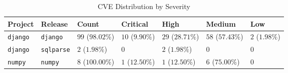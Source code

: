 \begin{table}
\caption{CVE Distribution by Severity}
\label{tab:cve-distribution}
\begin{tabular}{lllllll}
\toprule
Project & Release & Count & Critical & High & Medium & Low \\
\midrule
\texttt{django} & \texttt{django} & $99$ ($98.02\%$) & $10$ ($9.90\%$) & $29$ ($28.71\%$) & $58$ ($57.43\%$) & $2$ ($1.98\%$) \\
\texttt{django} & \texttt{sqlparse} & $2$ ($1.98\%$) & $0$ & $2$ ($1.98\%$) & $0$ & $0$ \\
\texttt{numpy} & \texttt{numpy} & $8$ ($100.00\%$) & $1$ ($12.50\%$) & $1$ ($12.50\%$) & $6$ ($75.00\%$) & $0$ \\
\bottomrule
\end{tabular}
\end{table}

